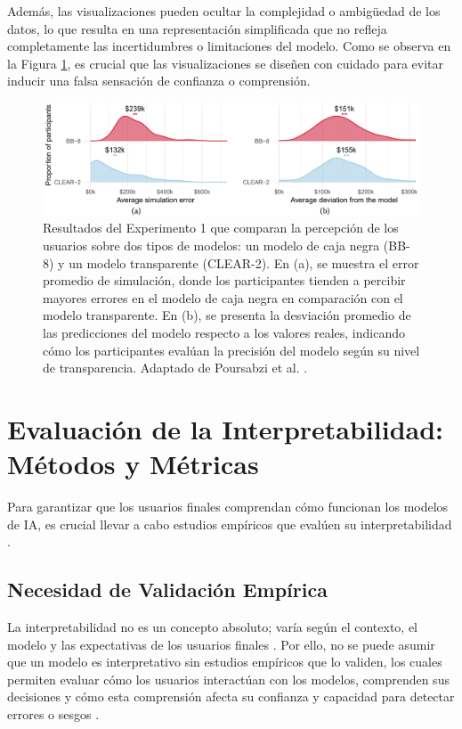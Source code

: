 Además, las visualizaciones pueden ocultar la complejidad o ambigüedad de los datos, lo que resulta en una representación simplificada que no refleja completamente las incertidumbres o limitaciones del modelo. Como se observa en la Figura \ref{fig:experiment1_comparison}, es crucial que las visualizaciones se diseñen con cuidado para evitar inducir una falsa sensación de confianza o comprensión.

\begin{figure}[H]
    \centering
    \includegraphics[width=1\textwidth]{include/error1.PNG}
    \caption{Resultados del Experimento 1 que comparan la percepción de los usuarios sobre dos tipos de modelos: un modelo de caja negra (BB-8) y un modelo transparente (CLEAR-2). En (a), se muestra el error promedio de simulación, donde los participantes tienden a percibir mayores errores en el modelo de caja negra en comparación con el modelo transparente. En (b), se presenta la desviación promedio de las predicciones del modelo respecto a los valores reales, indicando cómo los participantes evalúan la precisión del modelo según su nivel de transparencia. Adaptado de Poursabzi et al. \cite{Poursabzi-2021}.}
    \label{fig:experiment1_comparison}
\end{figure}

\section{Evaluación de la Interpretabilidad: Métodos y Métricas}

Para garantizar que los usuarios finales comprendan cómo funcionan los modelos de IA, es crucial llevar a cabo estudios empíricos que evalúen su interpretabilidad \cite{doshi2017towards}.

\subsection{Necesidad de Validación Empírica}

La interpretabilidad no es un concepto absoluto; varía según el contexto, el modelo y las expectativas de los usuarios finales \cite{lipton2016mythos}. Por ello, no se puede asumir que un modelo es interpretativo sin estudios empíricos que lo validen, los cuales permiten evaluar cómo los usuarios interactúan con los modelos, comprenden sus decisiones y cómo esta comprensión afecta su confianza y capacidad para detectar errores o sesgos \cite{Kaur-2020}.

